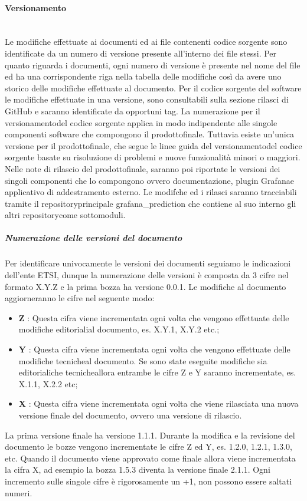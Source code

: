 		\paragraph{Versionamento}\mbox{}\\ [1mm]
		Le modifiche effettuate ai documenti ed ai file contenenti codice sorgente sono identificate da un numero di versione presente all'interno dei file stessi. Per quanto riguarda i documenti, ogni numero di versione è presente nel nome del file ed ha una corrispondente riga nella tabella delle modifiche così da avere uno storico delle modifiche effettuate al documento. Per il codice sorgente del software le modifiche effettuate in una versione, sono consultabili sulla sezione rilasci di GitHub e saranno identificate da opportuni tag.
		\newline
		La numerazione per il versionamento\glosp del codice sorgente applica in modo indipendente alle singole componenti software che compongono il prodotto\glosp finale. Tuttavia esiste un'unica versione per il prodotto\glosp finale, che segue le linee guida del versionamento\glosp del codice sorgente basate su risoluzione di problemi e nuove funzionalità minori o maggiori. Nelle note di rilascio del prodotto\glosp finale, saranno poi riportate le versioni dei singoli componenti che lo compongono ovvero documentazione, plugin Grafana\glosp e applicativo di addestramento esterno. Le modifche ed i rilasci saranno tracciabili tramite il repository\glosp principale grafana\_prediction che contiene al suo interno gli altri repository\glosp come sottomoduli.
		\subparagraph*{Numerazione delle versioni del documento}
		Per identificare univocamente le versioni dei documenti seguiamo le indicazioni dell'ente ETSI, dunque la numerazione delle versioni è composta da 3 cifre nel formato X.Y.Z e la prima bozza ha versione 0.0.1. Le modifiche al documento aggiorneranno le cifre nel seguente modo:
		\begin{itemize}
			\item \textbf{Z} : Questa cifra viene incrementata ogni volta che vengono effettuate delle modifiche editoriali\glosp al documento, es. X.Y.1, X.Y.2 etc.;
			\item \textbf{Y} : Questa cifra viene incrementata ogni volta che vengono effettuate delle modifiche tecniche\glosp al documento. Se sono state eseguite modifiche sia editoriali\glosp che tecniche\glosp allora entrambe le cifre Z e Y saranno incrementate, es. X.1.1, X.2.2 etc;
			\item \textbf{X} : Questa cifra viene incrementata ogni volta che viene rilasciata una nuova versione finale del documento, ovvero una versione di rilascio.			
		\end{itemize}
		La prima versione finale ha versione 1.1.1.
		\newline
		Durante la modifica e la revisione del documento le bozze vengono incrementate le cifre Z ed Y, es. 1.2.0, 1.2.1, 1.3.0, etc.
		\newline
		Quando il documento viene approvato come finale allora viene incrementata la cifra X, ad esempio la bozza 1.5.3 diventa la versione finale 2.1.1.
		\newline
		Ogni incremento sulle singole cifre è rigorosamente un +1, non possono essere saltati numeri.
		
